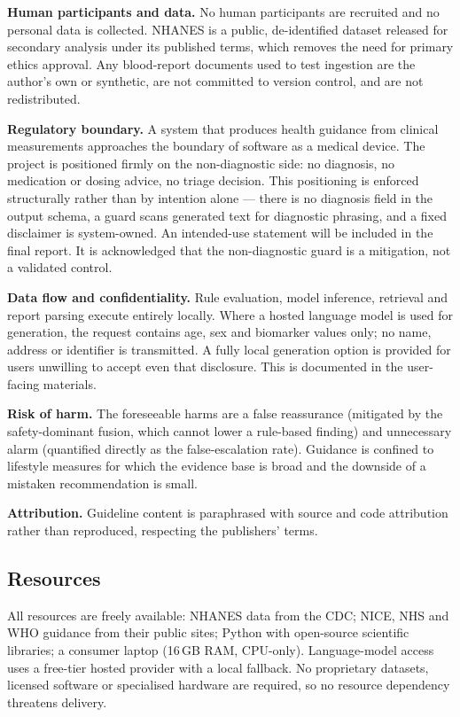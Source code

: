 \documentclass[11pt,a4paper]{article}
\begin{document}
\textbf{Human participants and data.} No human participants are recruited and no
personal data is collected. NHANES is a public, de-identified dataset released for
secondary analysis under its published terms, which removes the need for primary
ethics approval. Any blood-report documents used to test ingestion are the author's
own or synthetic, are not committed to version control, and are not redistributed.

\textbf{Regulatory boundary.} A system that produces health guidance from clinical
measurements approaches the boundary of software as a medical device. The project
is positioned firmly on the non-diagnostic side: no diagnosis, no medication or
dosing advice, no triage decision. This positioning is enforced structurally rather
than by intention alone --- there is no diagnosis field in the output schema, a
guard scans generated text for diagnostic phrasing, and a fixed disclaimer is
system-owned. An intended-use statement will be included in the final report. It is
acknowledged that the non-diagnostic guard is a mitigation, not a validated control.

\textbf{Data flow and confidentiality.} Rule evaluation, model inference, retrieval
and report parsing execute entirely locally. Where a hosted language model is used
for generation, the request contains age, sex and biomarker values only; no name,
address or identifier is transmitted. A fully local generation option is provided
for users unwilling to accept even that disclosure. This is documented in the
user-facing materials.

\textbf{Risk of harm.} The foreseeable harms are a false reassurance (mitigated by
the safety-dominant fusion, which cannot lower a rule-based finding) and
unnecessary alarm (quantified directly as the false-escalation rate). Guidance is
confined to lifestyle measures for which the evidence base is broad and the
downside of a mistaken recommendation is small.

\textbf{Attribution.} Guideline content is paraphrased with source and code
attribution rather than reproduced, respecting the publishers' terms.

\subsection{Resources}

All resources are freely available: NHANES data from the CDC; NICE, NHS and WHO
guidance from their public sites; Python with open-source scientific libraries; a
consumer laptop (16\,GB RAM, CPU-only). Language-model access uses a free-tier
hosted provider with a local fallback. No proprietary datasets, licensed software
or specialised hardware are required, so no resource dependency threatens delivery.
\end{document}
